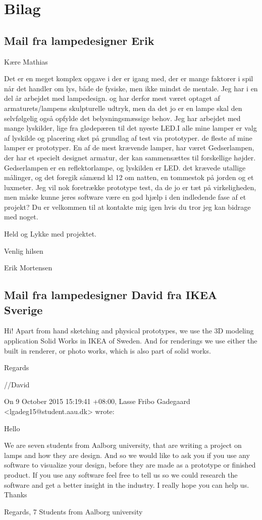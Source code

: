 \section{Bilag}


\subsection{Mail fra lampedesigner Erik}
Kære Mathias

Det er en meget komplex opgave i der er igang med, der er mange faktorer i spil når det handler om lys,
både de fysiske, men ikke mindst de mentale. 
Jeg har i en del år arbejdet med lampedesign. og har derfor mest været optaget af armaturets/lampens
skulpturelle udtryk, men da det jo er en lampe skal den selvfølgelig  også opfylde det belysningsmæssige
behov. Jeg har arbejdet med mange lyskilder, lige fra glødepæren til det nyeste LED.I alle mine lamper er
valg af lyskilde og placering sket på grundlag af test via prototyper. de fleste af mine lamper er prototyper.
En af de mest krævende lamper, har været Gedserlampen, der har et specielt designet armatur, der kan
sammensættes til forskellige højder. Gedserlampen er en reflektorlampe, og lyskilden er LED. det krævede
utallige målinger, og det foregik såmænd kl 12 om natten, en tommestok på jorden og et luxmeter.
Jeg vil nok foretrække prototype test, da de jo er tæt på virkeligheden, men måske kunne jeres software
være en god hjælp i den indledende fase af et projekt?
Du er velkommen til at kontakte mig igen hvis du tror jeg kan bidrage med noget.

Held og Lykke med projektet.

Venlig hilsen

Erik Mortensen

\subsection{Mail fra lampedesigner David fra IKEA Sverige}
Hi! Apart from hand sketching and physical prototypes, we use the 3D modeling application Solid Works in IKEA of Sweden. And for renderings we use either the built in renderer, or photo works, which is also part of solid works.

Regards 

//David 

  On 9 October 2015 15:19:41 +08:00, Lasse Fribo Gadegaard <lgadeg15@student.aau.dk> wrote:
   
  Hello
   
   
  We are seven students from Aalborg university, that are writing a project on lamps and how they are design. And so we would like to ask you if you use any software to visualize your design, before they are made as a prototype or finished product. If you use any software feel free to tell us so we could research the software and get a better insight in the industry. I really hope you can help us. Thanks
   
   
  Regards,
  7 Students from Aalborg university